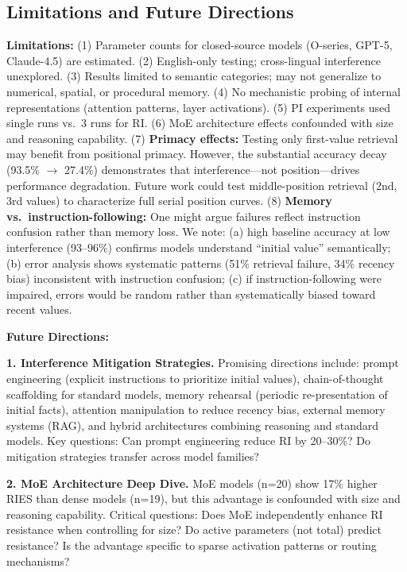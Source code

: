 \documentclass{article}
\begin{document}
\subsection{Limitations and Future Directions}

\textbf{Limitations:}
(1) Parameter counts for closed-source models (O-series, GPT-5, Claude-4.5) are estimated.
(2) English-only testing; cross-lingual interference unexplored.
(3) Results limited to semantic categories; may not generalize to numerical, spatial, or procedural memory.
(4) No mechanistic probing of internal representations (attention patterns, layer activations).
(5) PI experiments used single runs vs.\ 3 runs for RI.
(6) MoE architecture effects confounded with size and reasoning capability.
(7) \textbf{Primacy effects:} Testing only first-value retrieval may benefit from positional primacy. However, the substantial accuracy decay (93.5\% $\rightarrow$ 27.4\%) demonstrates that interference---not position---drives performance degradation. Future work could test middle-position retrieval (2nd, 3rd values) to characterize full serial position curves.
(8) \textbf{Memory vs.\ instruction-following:} One might argue failures reflect instruction confusion rather than memory loss. We note: (a) high baseline accuracy at low interference (93--96\%) confirms models understand ``initial value'' semantically; (b) error analysis shows systematic patterns (51\% retrieval failure, 34\% recency bias) inconsistent with instruction confusion; (c) if instruction-following were impaired, errors would be random rather than systematically biased toward recent values.

\textbf{Future Directions:}

\textbf{1. Interference Mitigation Strategies.}
Promising directions include: prompt engineering (explicit instructions to prioritize initial values), chain-of-thought scaffolding for standard models, memory rehearsal (periodic re-presentation of initial facts), attention manipulation to reduce recency bias, external memory systems (RAG), and hybrid architectures combining reasoning and standard models. Key questions: Can prompt engineering reduce RI by 20--30\%? Do mitigation strategies transfer across model families?

\textbf{2. MoE Architecture Deep Dive.}
MoE models (n=20) show 17\% higher RIES than dense models (n=19), but this advantage is confounded with size and reasoning capability. Critical questions: Does MoE independently enhance RI resistance when controlling for size? Do active parameters (not total) predict resistance? Is the advantage specific to sparse activation patterns or routing mechanisms?
\end{document}
